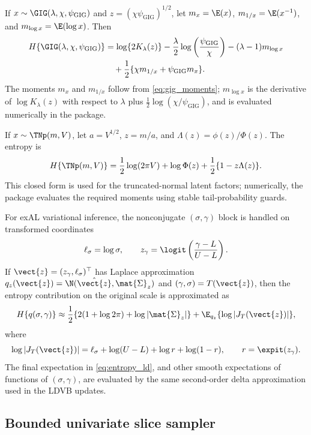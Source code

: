 If $x\sim\GIG(\lambda,\chi,\psi_{\mathrm{GIG}})$ and
$z=(\chi\psi_{\mathrm{GIG}})^{1/2}$, let
$m_x=\E(x)$, $m_{1/x}=\E(x^{-1})$, and
$m_{\log x}=\E(\log x)$. Then
\begin{align}
H\{\GIG(\lambda,\chi,\psi_{\mathrm{GIG}})\}
&=
\log\{2K_\lambda(z)\}
-\frac{\lambda}{2}\log\left(\frac{\psi_{\mathrm{GIG}}}{\chi}\right)
-(\lambda-1)m_{\log x} \nonumber\\
&\quad+
\frac{1}{2}\{\chi m_{1/x}+\psi_{\mathrm{GIG}} m_x\}.
\label{eq:entropy_gig}
\end{align}
The moments $m_x$ and $m_{1/x}$ follow from \eqref{eq:gig_moments};
$m_{\log x}$ is the derivative of $\log K_\lambda(z)$ with respect to
$\lambda$ plus $\frac{1}{2}\log(\chi/\psi_{\mathrm{GIG}})$, and is evaluated
numerically in the package.

If $x\sim\TNp(m,V)$, let $a=V^{1/2}$, $z=m/a$, and
$\Lambda(z)=\phi(z)/\Phi(z)$. The entropy is
\begin{equation}
H\{\TNp(m,V)\}
=
\frac{1}{2}\log(2\pi V)+\log\Phi(z)
+\frac{1}{2}\{1-z\Lambda(z)\}.
\label{eq:entropy_tnp}
\end{equation}
This closed form is used for the truncated-normal latent factors; numerically,
the package evaluates the required moments using stable tail-probability
guards.

For exAL variational inference, the nonconjugate $(\sigma,\gamma)$ block is handled on
transformed coordinates
\begin{equation}
\ell_\sigma=\log\sigma,\qquad
z_\gamma=\logit\left(\frac{\gamma-L}{U-L}\right).
\end{equation}
If $\vect{z}=(z_\gamma,\ell_\sigma)^\top$ has Laplace approximation
$q_z(\vect{z})=\N(\hat{\vect{z}},\mat{\Sigma}_z)$ and
$(\gamma,\sigma)=T(\vect{z})$, then the entropy contribution on the original
scale is approximated as
\begin{equation}
H\{q(\sigma,\gamma)\}
\approx
\frac{1}{2}\{2(1+\log 2\pi)+\log|\mat{\Sigma}_z|\}
+\E_{q_z}\{\log|J_T(\vect{z})|\},
\label{eq:entropy_ld}
\end{equation}
where
\begin{equation}
\log|J_T(\vect{z})|
=\ell_\sigma+\log(U-L)+\log r+\log(1-r),
\qquad r=\expit(z_\gamma).
\end{equation}
The final expectation in \eqref{eq:entropy_ld}, and other smooth expectations
of functions of $(\sigma,\gamma)$, are evaluated by the same second-order
delta approximation used in the LDVB updates.

\subsection{Bounded univariate slice sampler}
\label{sec:slice}

